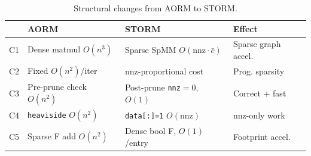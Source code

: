 \documentclass[journal]{IEEEtran}
\begin{document}
\begin{table}[t]
\centering
\caption{Structural changes from AORM to STORM.}
\label{tab:changes}
\setlength{\tabcolsep}{2pt}
\begin{tabular}{@{}clll@{}}
\toprule
 & \textbf{AORM} & \textbf{STORM} & \textbf{Effect} \\
\midrule
C1 & Dense matmul $O(n^3)$ & Sparse SpMM $O(\text{nnz}\!\cdot\!\bar{c})$ & Sparse graph accel. \\
C2 & Fixed $O(n^2)$/iter & nnz-proportional cost & Prog. sparsity \\
C3 & Pre-prune check $O(n^2)$ & Post-prune \texttt{nnz}$=0$, $O(1)$ & Correct + fast \\
C4 & \texttt{heaviside} $O(n^2)$ & \texttt{data[:]=1} $O(\text{nnz})$ & nnz-only work \\
C5 & Sparse F add $O(n^2)$ & Dense bool F, $O(1)$/entry & Footprint accel. \\
\bottomrule
\end{tabular}
\end{table}
\end{document}
